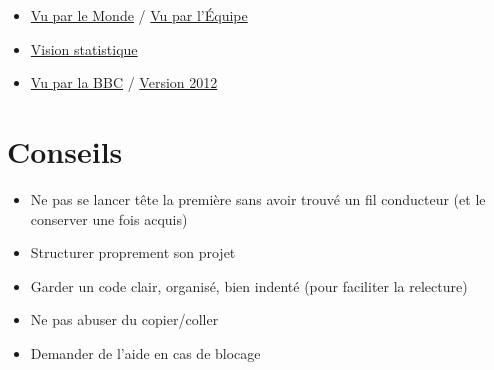 \documentclass{article}
\begin{document}
\begin{itemize}

\item
\href{https://www.lemonde.fr/les-decodeurs/article/2018/02/26/jo-2018-et-si-on-revoyait-le-classement_5262807_4355770.html}{Vu par le Monde} 
/ 
\href{http://www.wedodata.fr/equipe-jo2016.php}{Vu par l'Équipe}

\item
\href{https://www.statista.com/topics/1730/olympic-summer-games/}{Vision statistique}

\item

\href{https://www.bbc.com/sport/olympics/37148372}{Vu par la BBC} 
/
\href{https://www.theguardian.com/commentisfree/2012/aug/03/london-2012-olympics-open-data}{Version 2012}

\end{itemize}

\section{Conseils}

\begin{itemize}

\item Ne pas se lancer tête la première sans avoir trouvé un fil conducteur (et le conserver une fois acquis)

\item Structurer proprement son projet

\item Garder un code clair, organisé, bien indenté (pour faciliter la relecture)

\item Ne pas abuser du copier/coller

\item Demander de l'aide en cas de blocage

\end{itemize}
\end{document}
